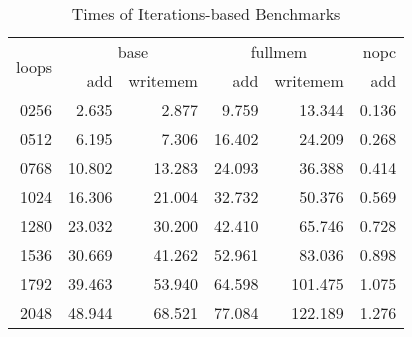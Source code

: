 \begin{table}
    \centering
    \begin{tabular}{r|rr|rr|r}
        \multirow{2}{*}{loops} & \multicolumn{2}{c|}{base} & \multicolumn{2}{c|}{fullmem} & nopc                      \\
                               & add                       & writemem                     & add    & writemem & add   \\ \hline
        0256                   & 2.635                     & 2.877                        & 9.759  & 13.344   & 0.136 \\
        0512                   & 6.195                     & 7.306                        & 16.402 & 24.209   & 0.268 \\
        0768                   & 10.802                    & 13.283                       & 24.093 & 36.388   & 0.414 \\
        1024                   & 16.306                    & 21.004                       & 32.732 & 50.376   & 0.569 \\
        1280                   & 23.032                    & 30.200                       & 42.410 & 65.746   & 0.728 \\
        1536                   & 30.669                    & 41.262                       & 52.961 & 83.036   & 0.898 \\
        1792                   & 39.463                    & 53.940                       & 64.598 & 101.475  & 1.075 \\
        2048                   & 48.944                    & 68.521                       & 77.084 & 122.189  & 1.276 \\
    \end{tabular}
    \caption{Times of Iterations-based Benchmarks}\label{tab:time_iter}
\end{table}

